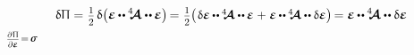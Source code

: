 \vspace{-0.5em}\noindent
{}

\nopagebreak\vspace{-0.2em}
\begin{equation*}
\variation{\potentialenergydensity}
= \hspace{.1ex}
\smash{\smalldisplaystyleonehalf} \hspace{.25ex}
\variation{ \bigl(
   \infinitesimaldeformation
   \hspace{-0.1ex} \dotdotp \hspace{-0.1ex}
   \stiffnesstensor
   \dotdotp \hspace{-0.1ex}
   \infinitesimaldeformation
\bigr)
} \hspace{-0.25ex}
= \hspace{.1ex}
\smash{\smalldisplaystyleonehalf}
\hspace{-0.1ex} \bigl( \hspace{.2ex}
\scalebox{.95}{$
   \variation{\infinitesimaldeformation}
   \hspace{-0.1ex} \dotdotp \hspace{-0.1ex}
   \stiffnesstensor
   \dotdotp \hspace{-0.1ex}
   \infinitesimaldeformation
   \hspace{.1ex} + \hspace{.1ex}
   \infinitesimaldeformation
   \hspace{-0.1ex} \dotdotp \hspace{-0.1ex}
   \stiffnesstensor
   \dotdotp
   \variation{\infinitesimaldeformation}
$}
\bigr)
\hspace{-0.25ex} =
\tikzmark{beginLinearStressAsDeformationAndStiffness}
\infinitesimaldeformation
\hspace{-0.1ex} \dotdotp \hspace{-0.1ex}
\stiffnesstensor
\tikzmark{endLinearStressAsDeformationAndStiffness}
\dotdotp
\variation{\infinitesimaldeformation}
\end{equation*}%
%
{${
   \scalebox{.8}{$ \scalebox{.83}{$
      \displaystyle\frac{\raisemath{-0.16em}{\partial \hspace{.1ex} \potentialenergydensity}}{\partial \infinitesimaldeformation}
   $} \hspace{-0.3ex} = \hspace{-0.3ex} \linearstress $}
}$}
\vspace{-1.2em}


